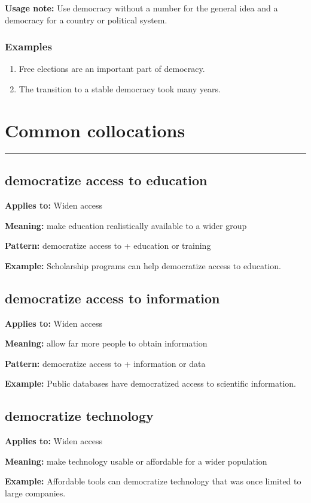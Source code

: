 \documentclass[11pt]{article}
\newcommand{\sectionrule}{\par\vspace{-0.5em}\noindent\textcolor{Accent}{\rule{\linewidth}{0.6pt}}\par}
\begin{document}
\textbf{Usage note:} Use democracy without a number for the general idea and a democracy for a country or political system.

\subsubsection{Examples}
\begin{enumerate}
  \item Free elections are an important part of democracy.
  \item The transition to a stable democracy took many years.
\end{enumerate}

\section{Common collocations}
\sectionrule
\subsection{democratize access to education}
\textbf{Applies to:} Widen access

\textbf{Meaning:} make education realistically available to a wider group

\textbf{Pattern:} democratize access to + education or training

\textbf{Example:} Scholarship programs can help democratize access to education.

\subsection{democratize access to information}
\textbf{Applies to:} Widen access

\textbf{Meaning:} allow far more people to obtain information

\textbf{Pattern:} democratize access to + information or data

\textbf{Example:} Public databases have democratized access to scientific information.

\subsection{democratize technology}
\textbf{Applies to:} Widen access

\textbf{Meaning:} make technology usable or affordable for a wider population

\textbf{Example:} Affordable tools can democratize technology that was once limited to large companies.
\end{document}
